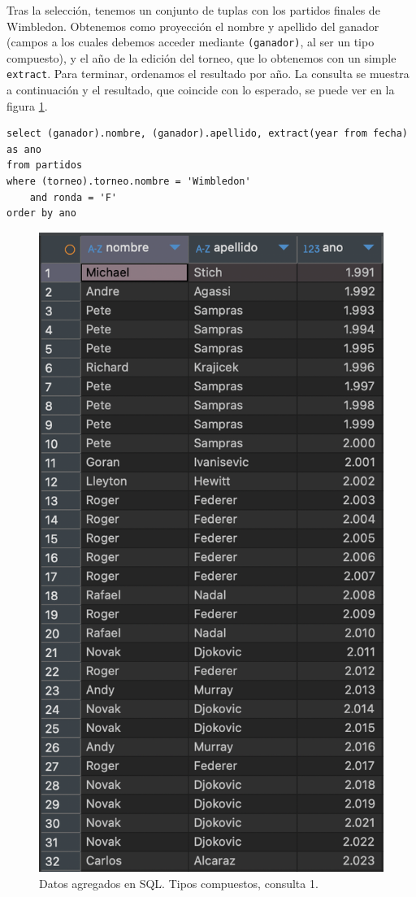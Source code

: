 Tras la selección, tenemos un conjunto de tuplas con los partidos finales de Wimbledon. Obtenemos como proyección el nombre y apellido del ganador (campos a los cuales debemos acceder mediante \texttt{(ganador)}, al ser un tipo compuesto), y el año de la edición del torneo, que lo obtenemos con un simple \texttt{extract}. Para terminar, ordenamos el resultado por año. La consulta se muestra a continuación y el resultado, que coincide con lo esperado, se puede ver en la figura \ref{fig:q1_com}.

\begin{verbatim}
select (ganador).nombre, (ganador).apellido, extract(year from fecha) as ano
from partidos
where (torneo).torneo.nombre = 'Wimbledon'
	and ronda = 'F'
order by ano
\end{verbatim}

\begin{figure}[H]
\centering
\includegraphics[height=0.4\textheight]{fotos/q1_com.png}
\caption{Datos agregados en SQL. Tipos compuestos, consulta 1.}
\label{fig:q1_com}
\end{figure}


